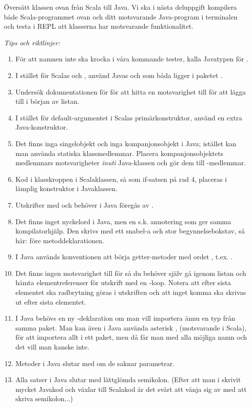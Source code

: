 
\Subtask Översätt klassen  ovan från Scala till Java. Vi ska i nästa deluppgift kompilera både Scala-programmet ovan och ditt motsvarande Java-program i terminalen och testa i REPL att klasserna har motsvarande funktionalitet.

\emph{Tips och riktlinjer:}
\begin{enumerate}
\item För att namnen inte ska krocka i våra kommande tester, kalla Javatypen för .
\item  I stället för Scalas  och , använd Javas  och  som båda ligger i paketet .
\item Undersök dokumentationen för  för att hitta en motsvarighet till  för att lägga till i början av listan.
\item I stället för default-argumentet i Scalas primärkonstruktor, använd en extra Java-konstruktor.
\item Det finns inga singelobjekt och inga kompanjonsobjekt i Java; istället kan man använda statiska klassmedlemmar. Placera kompanjonsobjektets medlemmars motsvarigheter \emph{inuti} Java-klassen och gör dem till -medlemmar.
\item Kod i klasskroppen i Scalaklassen, så som if-satsen på rad 4, placeras i lämplig konstruktor i Javaklassen.
\item Utskrifter med  och  behöver i Java föregås av .
\item Det finns inget nyckelord  i Java, men en s.k. annotering som ger samma kompilatorhjälp. Den skrivs med ett snabel-a och stor begynnelsebokstav, så här:   före metoddeklarationen.
\item I Java används konventionen att börja getter-metoder med ordet , t.ex. .
\item Det finns ingen motsvarighet till  för  så du behöver själv gå igenom listan och hämta elementreferenser för utskrift med en -loop. Notera att efter sista elementet ska radbrytning göras i utskriften och att inget komma ska skrivas ut efter sista elementet.
\item I Java behövs en ny -deklaration om man vill importera ännu en typ från samma paket. Man kan även i Java använda asterisk \code{*}, (motsvarande \code{_} i Scala), för att importera allt i ett paket, men då får man med alla möjliga namn och det vill man kanske inte.
\item Metoder i Java slutar med \code{()} om de saknar parametrar.
\item Alla satser i Java slutar med lättglömda semikolon. (Efter att man i skrivit mycket Javakod och växlar till Scalakod är det svårt att vänja sig av med att skriva semikolon...)
\end{enumerate}


